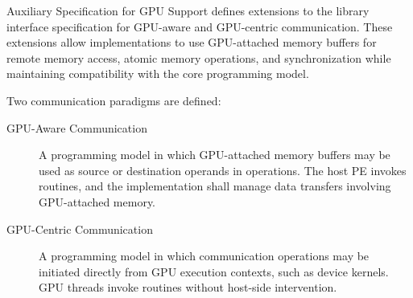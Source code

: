 
\openshmem Auxiliary Specification for GPU Support defines extensions to the
\openshmem library interface specification for GPU-aware and GPU-centric
communication. These extensions allow \openshmem implementations to use
GPU-attached memory buffers for remote memory access, atomic memory operations,
and synchronization while maintaining compatibility with the core \openshmem
programming model.

Two communication paradigms are defined:

\begin{description}
\item[GPU-Aware Communication]
A programming model in which GPU-attached memory buffers may be used as source
or destination operands in \openshmem operations. The host \ac{PE} invokes
\openshmem routines, and the implementation shall manage data transfers
involving GPU-attached memory.

\item[GPU-Centric Communication]
A programming model in which communication operations may be initiated directly
from \ac{GPU} execution contexts, such as device kernels. \ac{GPU} threads invoke
\openshmem routines without host-side intervention.
\end{description}

